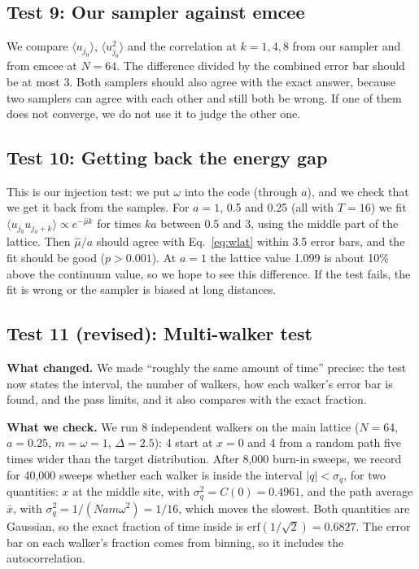 \documentclass[11pt]{article}
\begin{document}
\subsection*{Test 9: Our sampler against emcee}
We compare $\langle u_{j_0}\rangle$, $\langle u_{j_0}^2\rangle$ and the correlation at $k = 1, 4, 8$ from our sampler and from emcee at $N = 64$. The difference divided by the combined error bar should be at most 3. Both samplers should also agree with the exact answer, because two samplers can agree with each other and still both be wrong. If one of them does not converge, we do not use it to judge the other one.

\subsection*{Test 10: Getting back the energy gap}
This is our injection test: we put $\omega$ into the code (through $a$), and we check that we get it back from the samples. For $a = 1$, 0.5 and 0.25 (all with $T = 16$) we fit $\langle u_{j_0}u_{j_0+k}\rangle \propto e^{-\hat\mu k}$ for times $ka$ between 0.5 and 3, using the middle part of the lattice. Then $\hat\mu/a$ should agree with Eq.~\eqref{eq:wlat} within 3.5 error bars, and the fit should be good ($p > 0.001$). At $a = 1$ the lattice value 1.099 is about 10\% above the continuum value, so we hope to see this difference. If the test fails, the fit is wrong or the sampler is biased at long distances.

\subsection*{Test 11 (revised): Multi-walker test}

\textbf{What changed.} We made ``roughly the same amount of time'' precise: the
test now states the interval, the number of walkers, how each walker's error
bar is found, and the pass limits, and it also compares with the exact fraction.

\textbf{What we check.} We run 8 independent walkers on the main lattice
($N=64$, $a=0.25$, $m=\omega=1$, $\Delta=2.5$): 4 start at $x=0$ and 4 from a
random path five times wider than the target distribution. After 8{,}000
burn-in sweeps, we record for 40{,}000 sweeps whether each walker is inside the
interval $|q|<\sigma_q$, for two quantities: $x$ at the middle site, with
$\sigma_q^2=C(0)=0.4961$, and the path average $\bar x$, with
$\sigma_q^2=1/(Nam\omega^2)=1/16$, which moves the slowest. Both quantities are
Gaussian, so the exact fraction of time inside is
$\mathrm{erf}(1/\sqrt2)=0.6827$. The error bar on each walker's fraction comes
from binning, so it includes the autocorrelation.
\end{document}
